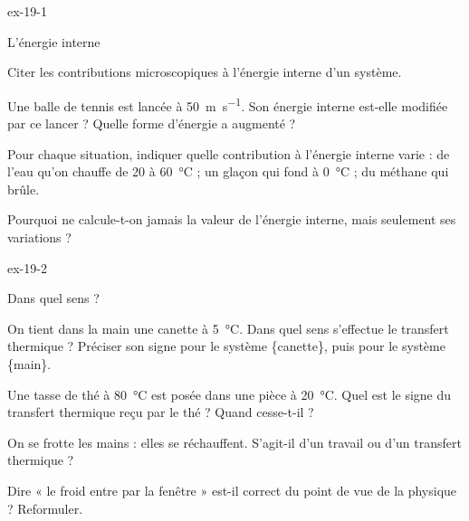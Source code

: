 \begin{blocLivre}{ex-19-1}
\begin{exercice}[1]{L'énergie interne}
\begin{questions}
\item Citer les contributions microscopiques à l'énergie interne d'un système.
\item Une balle de tennis est lancée à \qty{50}{m.s^{-1}}. Son énergie interne est-elle modifiée par ce lancer ? Quelle
forme d'énergie a augmenté ?
\item Pour chaque situation, indiquer quelle contribution à l'énergie interne varie : de l'eau qu'on chauffe de 20 à
\qty{60}{\degreeCelsius} ; un glaçon qui fond à \qty{0}{\degreeCelsius} ; du méthane qui brûle.
\item Pourquoi ne calcule-t-on jamais la valeur de l'énergie interne, mais seulement ses variations ?
\end{questions}
\end{exercice}
\end{blocLivre}
\begin{blocLivre}{ex-19-2}
\begin{exercice}[1]{Dans quel sens ?}
\begin{questions}
\item On tient dans la main une canette à \qty{5}{\degreeCelsius}. Dans quel sens s'effectue le transfert thermique ? Préciser
son signe pour le système \{canette\}, puis pour le système \{main\}.
\item Une tasse de thé à \qty{80}{\degreeCelsius} est posée dans une pièce à \qty{20}{\degreeCelsius}. Quel est le signe du
transfert thermique reçu par le thé ? Quand cesse-t-il ?
\item On se frotte les mains : elles se réchauffent. S'agit-il d'un travail ou d'un transfert thermique ?
\item Dire « le froid entre par la fenêtre » est-il correct du point de vue de la physique ? Reformuler.
\end{questions}
\end{exercice}
\end{blocLivre}
